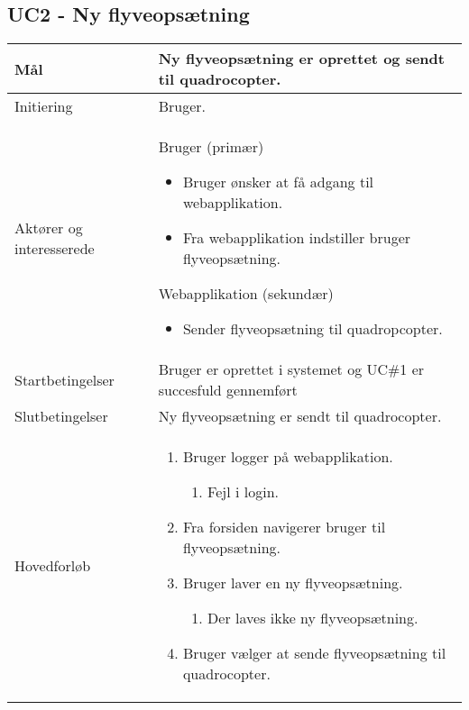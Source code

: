 \subsection*{UC2 - Ny flyveopsætning}

\begin{table}[H]
\begin{tabular}{| p{3cm}| p{11.5cm}|}
\hline

Mål	 							& Ny flyveopsætning er oprettet og sendt til quadrocopter. \\\hline
Initiering							& Bruger. \\\hline
Aktører og interesserede			& Bruger (primær) 
										\begin{itemize}
											\item Bruger ønsker at få adgang til webapplikation.
											\item Fra webapplikation indstiller bruger flyveopsætning.
										\end{itemize}
									  Webapplikation (sekundær)
										\begin{itemize}
											\item Sender flyveopsætning til quadropcopter.
										\end{itemize} \\\hline
Startbetingelser						& Bruger er oprettet i systemet og UC\#1 er succesfuld gennemført  \\\hline
Slutbetingelser						& Ny flyveopsætning er sendt til quadrocopter. \\\hline
Hovedforløb				&
 
									\renewcommand{\labelenumi}{\arabic{enumi}.}
									\renewcommand{\labelenumii}{\Roman{enumii}:}

									\begin{enumerate}[topsep=0.0cm, leftmargin=0.5cm]
										\item Bruger logger på webapplikation.
										\begin{enumerate}[partopsep=4cm, topsep=0cm, leftmargin=1cm]
												\item Fejl i login.
										\end{enumerate}
										\item Fra forsiden navigerer bruger til flyveopsætning.
										\item Bruger laver en ny flyveopsætning.
										\begin{enumerate}[partopsep=4cm, topsep=0cm, leftmargin=1cm]
												\item Der laves ikke ny flyveopsætning.
										\end{enumerate}
										\item Bruger vælger at sende flyveopsætning til quadrocopter.
									\end{enumerate} \\\hline	


\end{tabular}
\end{table}
